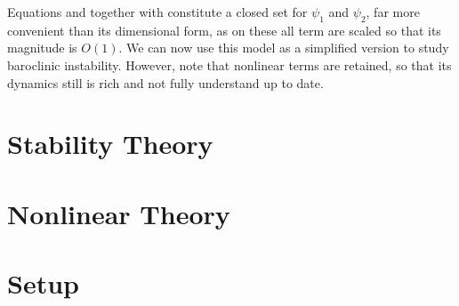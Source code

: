 Equations  and  together with  constitute a closed set for $\psi_1$ and $\psi_2$, far more convenient than its dimensional form, as on these all term are scaled so that its magnitude is $O(1)$. We can now use this model as a simplified version to study baroclinic instability. However, note that nonlinear terms are retained, so that its dynamics still is rich and not fully understand up to date.

\section{Stability Theory}
\label{s:stability}

\section{Nonlinear Theory}
\label{s:nonlinear}
\section{Setup}
\label{s:setup}
